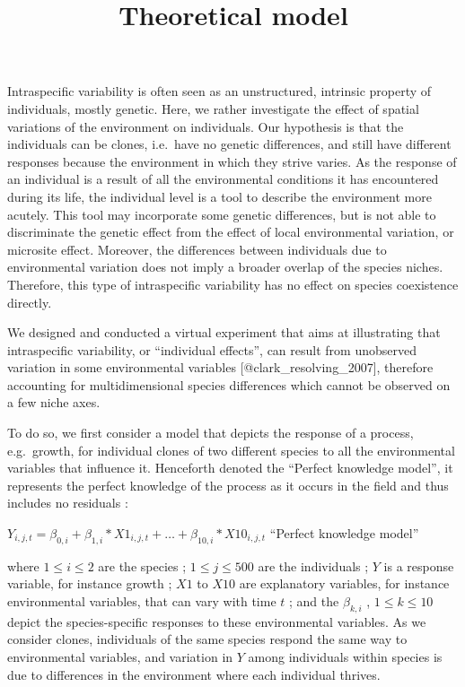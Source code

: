 \documentclass[
]{article}
\title{Theoretical model}
\author{}
\date{\vspace{-2.5em}}
\begin{document}
\maketitle

Intraspecific variability is often seen as an unstructured, intrinsic
property of individuals, mostly genetic. Here, we rather investigate the
effect of spatial variations of the environment on individuals. Our
hypothesis is that the individuals can be clones, i.e.~have no genetic
differences, and still have different responses because the environment
in which they strive varies. As the response of an individual is a
result of all the environmental conditions it has encountered during its
life, the individual level is a tool to describe the environment more
acutely. This tool may incorporate some genetic differences, but is not
able to discriminate the genetic effect from the effect of local
environmental variation, or microsite effect. Moreover, the differences
between individuals due to environmental variation does not imply a
broader overlap of the species niches. Therefore, this type of
intraspecific variability has no effect on species coexistence directly.

We designed and conducted a virtual experiment that aims at illustrating
that intraspecific variability, or ``individual effects'', can result
from unobserved variation in some environmental variables
{[}@clark\_resolving\_2007{]}, therefore accounting for multidimensional
species differences which cannot be observed on a few niche axes.

To do so, we first consider a model that depicts the response of a
process, e.g.~growth, for individual clones of two different species to
all the environmental variables that influence it. Henceforth denoted
the ``Perfect knowledge model'', it represents the perfect knowledge of
the process as it occurs in the field and thus includes no residuals :

\(Y_{i,j,t} = \beta_{0,i} + \beta_{1,i} * X1_{i,j,t} + \ldots + \beta_{10,i} * X10_{i,j,t}\)
\hfill``Perfect knowledge model''

where \(1 \leq i \leq 2\) are the species ; \(1 \leq j \leq 500\) are
the individuals ; \(Y\) is a response variable, for instance growth ;
\(X1\) to \(X10\) are explanatory variables, for instance environmental
variables, that can vary with time \(t\) ; and the \(\beta_{k,i}\) ,
\(1 \leq k \leq 10\) depict the species-specific responses to these
environmental variables. As we consider clones, individuals of the same
species respond the same way to environmental variables, and variation
in \(Y\) among individuals within species is due to differences in the
environment where each individual thrives.
\end{document}
